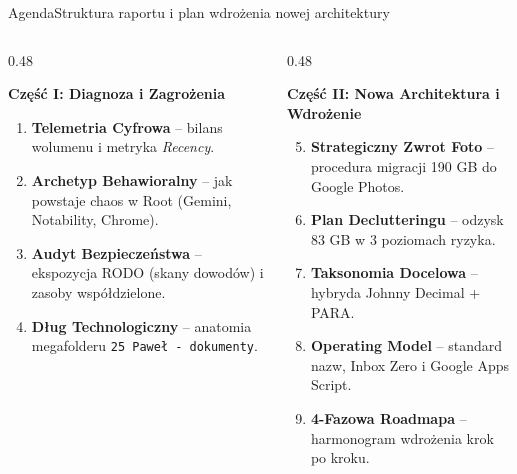 \documentclass[aspectratio=169, 10pt]{beamer}
\begin{document}
\begin{frame}{Agenda}{Struktura raportu i plan wdrożenia nowej architektury}
  \begin{columns}[T]
    \begin{column}{0.48\textwidth}
      \begin{block}{\textbf{Część I: Diagnoza i Zagrożenia}}
        \begin{enumerate}
          \item \textbf{Telemetria Cyfrowa} -- bilans wolumenu i metryka \textit{Recency}.
          \item \textbf{Archetyp Behawioralny} -- jak powstaje chaos w Root (Gemini, Notability, Chrome).
          \item \textbf{Audyt Bezpieczeństwa} -- ekspozycja RODO (skany dowodów) i zasoby współdzielone.
          \item \textbf{Dług Technologiczny} -- anatomia megafolderu \texttt{25 Paweł - dokumenty}.
        \end{enumerate}
      \end{block}
    \end{column}

    \begin{column}{0.48\textwidth}
      \begin{exampleblock}{\textbf{Część II: Nowa Architektura i Wdrożenie}}
        \begin{enumerate}
          \setcounter{enumi}{4}
          \item \textbf{Strategiczny Zwrot Foto} -- procedura migracji 190 GB do Google Photos.
          \item \textbf{Plan Declutteringu} -- odzysk 83 GB w 3 poziomach ryzyka.
          \item \textbf{Taksonomia Docelowa} -- hybryda Johnny Decimal + PARA.
          \item \textbf{Operating Model} -- standard nazw, Inbox Zero i Google Apps Script.
          \item \textbf{4-Fazowa Roadmapa} -- harmonogram wdrożenia krok po kroku.
        \end{enumerate}
      \end{exampleblock}
    \end{column}
  \end{columns}
\end{frame}
\end{document}
